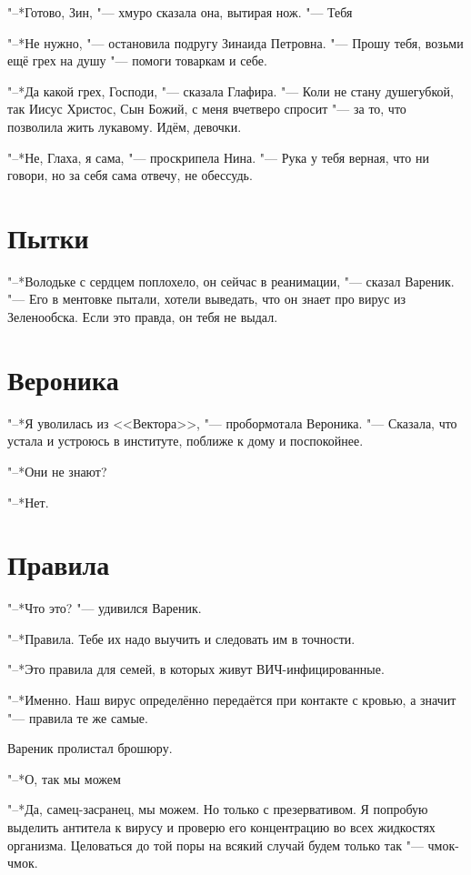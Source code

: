 "--*Готово, Зин, "--- хмуро сказала она, вытирая нож.
"--- Тебя\ldotsq

"--*Не нужно, "--- остановила подругу Зинаида Петровна.
"--- Прошу тебя, возьми ещё грех на душу "--- помоги товаркам и себе.

"--*Да какой грех, Господи, "--- сказала Глафира.
"--- Коли не стану душегубкой, так Иисус Христос, Сын Божий, с меня вчетверо спросит "--- за то, что позволила жить лукавому.
Идём, девочки.

"--*Не, Глаха, я сама, "--- проскрипела Нина.
"--- Рука у тебя верная, что ни говори, но за себя сама отвечу, не обессудь.

\section{Пытки}

"--*Володьке с сердцем поплохело, он сейчас в реанимации, "--- сказал Вареник.
"--- Его в ментовке пытали, хотели выведать, что он знает про вирус из Зеленообска.
Если это правда, он тебя не выдал.

\section{Вероника}

"--*Я уволилась из <<Вектора>>, "--- пробормотала Вероника.
"--- Сказала, что устала и устроюсь в институте, поближе к дому и поспокойнее.

"--*Они не знают?

"--*Нет.

\section{Правила}

"--*Что это? "--- удивился Вареник.

"--*Правила.
Тебе их надо выучить и следовать им в точности.

"--*Это правила для семей, в которых живут ВИЧ-инфицированные.

"--*Именно.
Наш вирус определённо передаётся при контакте с кровью, а значит "--- правила те же самые.

Вареник пролистал брошюру.

"--*О, так мы можем\ldotsq

"--*Да, самец-засранец, мы можем.
Но только с презервативом.
Я попробую выделить антитела к вирусу и проверю его концентрацию во всех жидкостях организма.
Целоваться до той поры на всякий случай будем только так "--- чмок-чмок.

